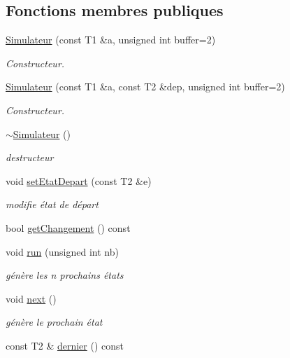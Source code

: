 \subsection*{Fonctions membres publiques}
\begin{DoxyCompactItemize}
\item 
\hyperlink{class_simulateur_afbd90fb92cd6e29e7a2ffe222d0194f8}{Simulateur} (const T1 \&a, unsigned int buffer=2)
\begin{DoxyCompactList}\small\item\em Constructeur. \end{DoxyCompactList}\item 
\hyperlink{class_simulateur_a9c6136e1ffa9ff733ab6b6680a556535}{Simulateur} (const T1 \&a, const T2 \&dep, unsigned int buffer=2)
\begin{DoxyCompactList}\small\item\em Constructeur. \end{DoxyCompactList}\item 
\hyperlink{class_simulateur_a9253bdd8f60dd5f2f2af9ab1e855304c}{$\sim$\+Simulateur} ()
\begin{DoxyCompactList}\small\item\em destructeur \end{DoxyCompactList}\item 
void \hyperlink{class_simulateur_a31296b4599796563a8a6ad1177b76ef4}{set\+Etat\+Depart} (const T2 \&e)
\begin{DoxyCompactList}\small\item\em modifie état de départ \end{DoxyCompactList}\item 
bool \hyperlink{class_simulateur_a6e5511f65b8da6dec66ef9d32e1d1a6a}{get\+Changement} () const 
\item 
void \hyperlink{class_simulateur_a5a9d0c9de702ee1d71c02126a5a80fad}{run} (unsigned int nb)
\begin{DoxyCompactList}\small\item\em génère les n prochains états \end{DoxyCompactList}\item 
void \hyperlink{class_simulateur_a6043e64df6e41c1d4ae84da540786379}{next} ()
\begin{DoxyCompactList}\small\item\em génère le prochain état \end{DoxyCompactList}\item 
const T2 \& \hyperlink{class_simulateur_a90dded0212c5d4f7005b90290f30c81a}{dernier} () const 

\end{DoxyCompactItemize}
